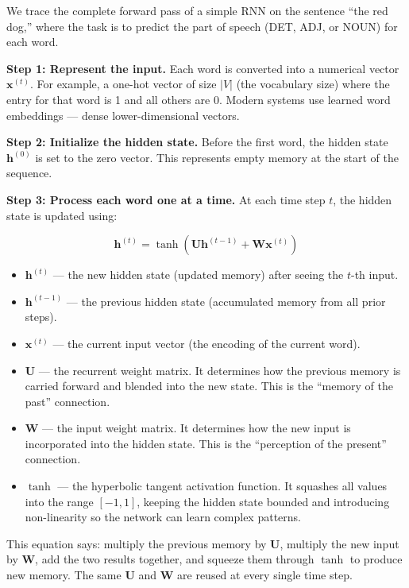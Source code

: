 We trace the complete forward pass of a simple RNN on the sentence ``the red dog,''
where the task is to predict the part of speech (DET, ADJ, or NOUN) for each word.

\medskip
\noindent\textbf{Step 1: Represent the input.}
Each word is converted into a numerical vector $\mathbf{x}^{(t)}$. For example, a
one-hot vector of size $|V|$ (the vocabulary size) where the entry for that word is 1
and all others are 0. Modern systems use learned word embeddings --- dense
lower-dimensional vectors.

\medskip
\noindent\textbf{Step 2: Initialize the hidden state.}
Before the first word, the hidden state $\mathbf{h}^{(0)}$ is set to the zero vector.
This represents empty memory at the start of the sequence.

\medskip
\noindent\textbf{Step 3: Process each word one at a time.}
At each time step $t$, the hidden state is updated using:

\[
\mathbf{h}^{(t)} = \tanh\!\left(\mathbf{U}\mathbf{h}^{(t-1)} + \mathbf{W}\mathbf{x}^{(t)}\right)
\]

\begin{itemize}
  \item $\mathbf{h}^{(t)}$ --- the new hidden state (updated memory) after seeing the
        $t$-th input.
  \item $\mathbf{h}^{(t-1)}$ --- the previous hidden state (accumulated memory from all
        prior steps).
  \item $\mathbf{x}^{(t)}$ --- the current input vector (the encoding of the current
        word).
  \item $\mathbf{U}$ --- the recurrent weight matrix. It determines how the previous
        memory is carried forward and blended into the new state. This is the
        ``memory of the past'' connection.
  \item $\mathbf{W}$ --- the input weight matrix. It determines how the new input is
        incorporated into the hidden state. This is the ``perception of the present''
        connection.
  \item $\tanh$ --- the hyperbolic tangent activation function. It squashes all values
        into the range $[-1, 1]$, keeping the hidden state bounded and introducing
        non-linearity so the network can learn complex patterns.
\end{itemize}

This equation says: multiply the previous memory by $\mathbf{U}$, multiply the new input
by $\mathbf{W}$, add the two results together, and squeeze them through $\tanh$ to
produce new memory. The same $\mathbf{U}$ and $\mathbf{W}$ are reused at every single
time step.

